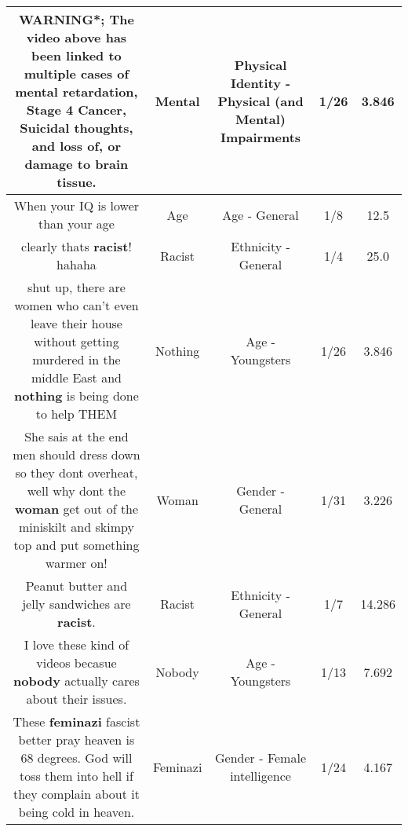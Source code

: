 \documentclass[11pt]{article}
\newlength\mylength
\begin{document}
\begin{center}
\begin{longtable}{|C{.65\mylength}|C{.30\mylength}|C{.12\mylength}|C{.12\mylength}|C{.12\mylength}|}
  \small *WARNING*; The video above has been linked to multiple cases of \textbf{mental} retardation, Stage 4 Cancer, Suicidal thoughts, and loss of, or damage to brain tissue.\normalsize   & Mental & Physical Identity - Physical (and Mental) Impairments & 1/26 & 3.846 \\  \hline
  \small When your IQ is lower than your age\normalsize   & Age & Age - General & 1/8 & 12.5 \\  \hline
  \small clearly thats \textbf{racist}! hahaha\normalsize   & Racist & Ethnicity - General & 1/4 & 25.0 \\  \hline
  \small shut up, there are women who can't even leave their house without getting murdered in the middle East and \textbf{nothing} is being done to help THEM\normalsize   & Nothing & Age - Youngsters & 1/26 & 3.846 \\  \hline
  \small She sais at the end men should dress down so they dont overheat, well why dont the \textbf{woman} get out of the miniskilt and skimpy top and put something warmer on!\normalsize   & Woman & Gender - General & 1/31 & 3.226 \\  \hline
  \small Peanut butter and jelly sandwiches are \textbf{racist}.\normalsize   & Racist & Ethnicity - General & 1/7 & 14.286 \\  \hline
  \small I love these kind of videos becasue \textbf{nobody} actually cares about their issues.\normalsize   & Nobody & Age - Youngsters & 1/13 & 7.692 \\  \hline
  \small These \textbf{feminazi} fascist better pray heaven is 68 degrees. God will toss them into hell if they complain about it being cold in heaven.\normalsize   & Feminazi & Gender - Female intelligence & 1/24 & 4.167 \\  \hline

\end{longtable}
\end{center}
\end{document}
